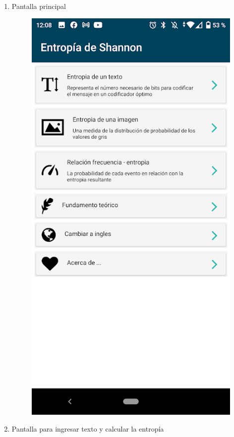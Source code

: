 \documentclass[conference]{IEEEtran}
\begin{document}
\begin{enumerate}
    \item Pantalla principal
    \begin{figure}[h!]
        \centering 
        \includegraphics[scale=0.4]{captura0.png}
    \end{figure}
    \newpage  
    \item Pantalla para ingresar texto y calcular la entropía
    \begin{figure}[h!]
        \centering 

\end{figure}
\end{enumerate}
\end{document}

